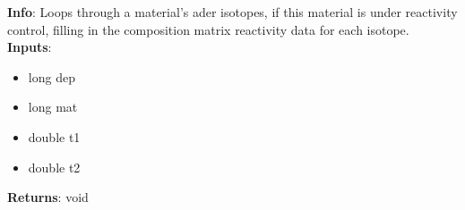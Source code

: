 \textbf{Info}: Loops through a material's ader isotopes, if this material is
under reactivity control, filling in the composition matrix reactivity data
for each isotope. \\

\noindent \textbf{Inputs}:
\begin{itemize}
\item{long dep}
\item{long mat}
\item{double t1}
\item{double t2}
\end{itemize}

\noindent \textbf{Returns}: void
